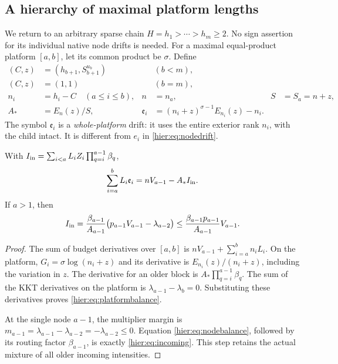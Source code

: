 \subsection{A hierarchy of maximal platform lengths}

We return to an arbitrary sparse chain $H=h_1>\cdots>h_m\ge2$.
No sign assertion for its individual native node drifts is needed.
For a maximal equal-product platform $[a,b]$, let its common product
be $\sigma$. Define
\begin{align}
 (C,z)&=(h_{b+1},S_{b+1}^{u_b}) &&(b<m),\\
 (C,z)&=(1,1) &&(b=m),\\
 n_i&=h_i-C\quad(a\le i\le b),& n&=n_a,& S&=S_a=n+z,\\
 A_*&=E_n(z)/S,&
 \mathfrak e_i&=(n_i+z)^{\sigma-1}E_{n_i}(z)-n_i.
 \label{hier:eq:platformparameters}
\end{align}
The symbol $\mathfrak e_i$ is a \emph{whole-platform} drift: it
uses the entire exterior rank $n_i$, with the child intact. It is
different from $e_i$ in \eqref{hier:eq:nodedrift}.

\begin{lemma}\label{hier:lem:platformbalance}
With $I_{\rm in}=\sum_{i<a}L_iZ_i\prod_{q=i}^{a-1}\beta_q$,
\begin{equation}
 \sum_{i=a}^bL_i\mathfrak e_i
       =nV_{a-1}-A_*I_{\rm in}. \label{hier:eq:platformbalance}
\end{equation}
If $a>1$, then
\begin{equation}
 I_{\rm in}
 =\frac{\beta_{a-1}}{A_{a-1}}
    \bigl(p_{a-1}V_{a-1}-\lambda_{a-2}\bigr)
 \le\frac{\beta_{a-1}p_{a-1}}{A_{a-1}}V_{a-1}.
 \label{hier:eq:incoming}
\end{equation}
\end{lemma}
\begin{proof}
The sum of budget derivatives over $[a,b]$ is
$nV_{a-1}+\sum_{i=a}^bn_iL_i$. On the platform,
$G_i=\sigma\log(n_i+z)$ and its derivative is
$E_{n_i}(z)/(n_i+z)$, including the variation in $z$. The derivative
for an older block is $A_*\prod_{q=i}^{a-1}\beta_q$.
The sum of the KKT derivatives on the platform is
$\lambda_{a-1}-\lambda_b=0$. Substituting these derivatives proves
\eqref{hier:eq:platformbalance}.

At the single node $a-1$, the multiplier margin is
$m_{a-1}=\lambda_{a-1}-\lambda_{a-2}=-\lambda_{a-2}\le0$.
Equation \eqref{hier:eq:nodebalance}, followed by its routing factor
$\beta_{a-1}$, is exactly \eqref{hier:eq:incoming}. This step retains
the actual mixture of all older incoming intensities.
\end{proof}

